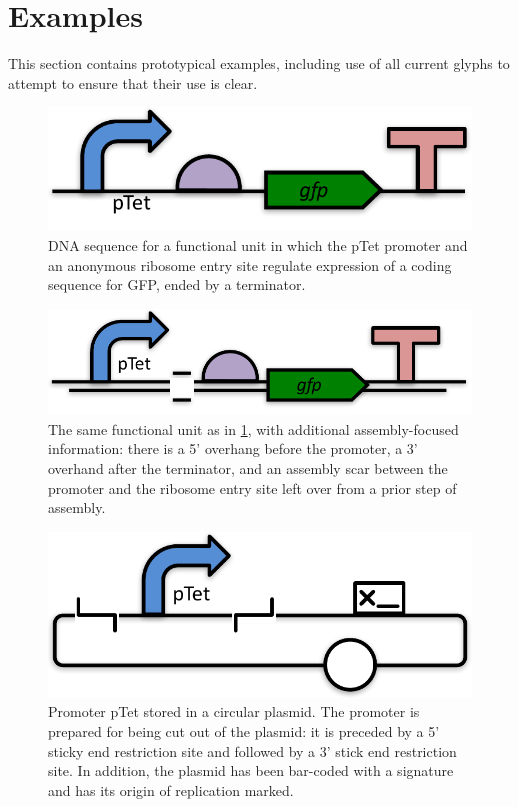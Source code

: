 \section{Examples}\label{sec:examples}

This section contains prototypical examples, including use of all
current glyphs to attempt to ensure that their use is clear.

\begin{figure}[h!]
\includegraphics[scale=0.5]{figures/apdx-examples/apdx-exa1.pdf}
\caption{DNA sequence for a functional unit in which the pTet promoter and an anonymous ribosome entry site regulate expression of a coding sequence for GFP, ended by a terminator.}
\label{f:apdx:exa1}
\end{figure}

\begin{figure}[h!]
\includegraphics[scale=0.5]{figures/apdx-examples/apdx-exa2.pdf}
\caption{The same functional unit as in \ref{f:apdx:exa1}, with additional assembly-focused information: there is a 5' overhang before the promoter, a 3' overhand after the terminator, and an assembly scar between the promoter and the ribosome entry site left over from a prior step of assembly.}
\label{f:apdx:exa2}
\end{figure}

\begin{figure}[h!]
\includegraphics[scale=0.5]{figures/apdx-examples/apdx-exa3.pdf}
\caption{Promoter pTet stored in a circular plasmid. The promoter is prepared for being cut out of the plasmid: it is preceded by a 5' sticky end restriction site and followed by a 3' stick end restriction site.  In addition, the plasmid has been bar-coded with a signature and has its origin of replication marked.}
\label{f:apdx:exa3}
\end{figure}


